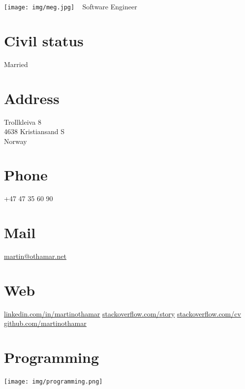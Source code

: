 \documentclass[]{cv-class}
\begin{document}
\begin{aside}
\color{blue}
  \texttt{[image: img/meg.jpg]}
    ~
      {Software Engineer}
   ~
  \section{Civil status}
    {\whitebodyfont Married}
  	~
  \section{Address}
    {\whitebodyfont Trollkleiva 8\\
    4638 Kristiansand S\\
    Norway}
    ~
  \section{Phone}
    {\whitebodyfont +47 47 35 60 90}
    ~
  \section{Mail}
    \underline{\href{mailto:martin@othamar.net}{martin@othamar.net}}
    ~
  \section{Web}
	\vspace{0.10cm}
    \underline{\href{https://no.linkedin.com/in/martinothamar}{{\whitebodyfont linkedin.com/in/martinothamar}}}
	\vspace{0.10cm}
    \underline{\href{https://stackoverflow.com/story/martinothamar}{stackoverflow.com/story}}
	\vspace{0.10cm}
    \underline{\href{https://stackoverflow.com/cv/martinothamar}{stackoverflow.com/cv}}
	\vspace{0.10cm}
    \underline{\href{https://github.com/martinothamar}{github.com/martinothamar}}
    ~
  \section{Programming}
    \texttt{[image: img/programming.png]}
    ~

\end{aside}
\end{document}
